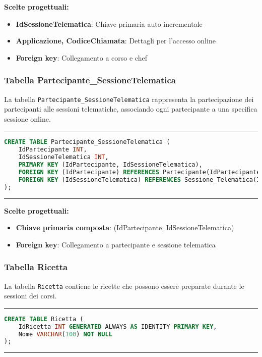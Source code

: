 \textbf{Scelte progettuali:}
\begin{itemize}
    \item \textbf{IdSessioneTelematica}: Chiave primaria auto-incrementale
    \item \textbf{Applicazione, CodiceChiamata}: Dettagli per l'accesso online
    \item \textbf{Foreign key}: Collegamento a corso e chef
\end{itemize}

\subsubsection{Tabella Partecipante\_SessioneTelematica}

La tabella \texttt{Partecipante\_SessioneTelematica} rappresenta la partecipazione dei partecipanti alle sessioni telematiche, associando ogni partecipante a una specifica sessione online.

\noindent\rule{\textwidth}{0.4pt}
\begin{lstlisting}[language=SQL, style=sqlstyle]
CREATE TABLE Partecipante_SessioneTelematica (
    IdPartecipante INT,
    IdSessioneTelematica INT,
    PRIMARY KEY (IdPartecipante, IdSessioneTelematica),
    FOREIGN KEY (IdPartecipante) REFERENCES Partecipante(IdPartecipante),
    FOREIGN KEY (IdSessioneTelematica) REFERENCES Sessione_Telematica(IdSessioneTelematica)
);
\end{lstlisting}
\noindent\rule{\textwidth}{0.4pt}

\textbf{Scelte progettuali:}
\begin{itemize}
    \item \textbf{Chiave primaria composta}: (IdPartecipante, IdSessioneTelematica)
    \item \textbf{Foreign key}: Collegamento a partecipante e sessione telematica
\end{itemize}

\subsubsection{Tabella Ricetta}

La tabella \texttt{Ricetta} contiene le ricette che possono essere preparate durante le sessioni dei corsi.

\noindent\rule{\textwidth}{0.4pt}
\begin{lstlisting}[language=SQL, style=sqlstyle]
CREATE TABLE Ricetta (
    IdRicetta INT GENERATED ALWAYS AS IDENTITY PRIMARY KEY,
    Nome VARCHAR(100) NOT NULL
);
\end{lstlisting}
\noindent\rule{\textwidth}{0.4pt}

